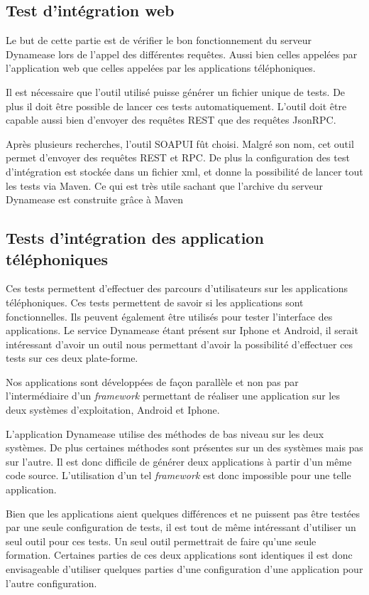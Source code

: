 \subsection{Test d'intégration web}

Le but de cette partie est de vérifier le bon fonctionnement du serveur Dynamease lors de l'appel des différentes requêtes. Aussi bien celles appelées par l'application web que celles appelées par les applications téléphoniques.

Il est nécessaire que l'outil utilisé puisse générer un fichier unique de tests. De plus il doit être possible de lancer ces tests automatiquement. L'outil doit être capable aussi bien d'envoyer des requêtes REST que des requêtes JsonRPC.

Après plusieurs recherches, l'outil SOAPUI fût choisi. Malgré son nom, cet outil permet d'envoyer des requêtes REST et RPC. De plus la configuration des test d'intégration est stockée dans un fichier xml, et donne la possibilité de lancer tout les tests via Maven. Ce qui est très utile sachant que l'archive du serveur Dynamease est construite grâce à Maven

\subsection{Tests d'intégration des application téléphoniques}

Ces tests permettent d'effectuer des parcours d'utilisateurs sur les applications téléphoniques. Ces tests permettent de savoir si les applications sont fonctionnelles. Ils peuvent également être utilisés pour tester l'interface des applications. Le service Dynamease étant présent sur Iphone et Android, il serait intéressant d'avoir un outil nous permettant d'avoir la possibilité d'effectuer ces tests sur ces deux plate-forme. 

Nos applications sont développées de façon parallèle et non pas par l'intermédiaire d'un \textit{framework} permettant de réaliser une application sur les deux systèmes d'exploitation, Android et Iphone. 

L'application Dynamease utilise des méthodes de bas niveau sur les deux systèmes. De plus certaines méthodes sont présentes sur un des systèmes mais pas sur l'autre. Il est donc difficile de générer deux applications à partir d'un même code source. L'utilisation d'un tel \textit{framework} est donc impossible pour une telle application.

Bien que les applications aient quelques différences et ne puissent pas être testées par une seule configuration de tests, il est tout de même intéressant d'utiliser un seul outil pour ces tests. Un seul outil permettrait de faire qu'une seule formation. Certaines parties de ces deux applications sont identiques il est donc envisageable d'utiliser quelques parties d'une configuration d'une application pour l'autre configuration.

